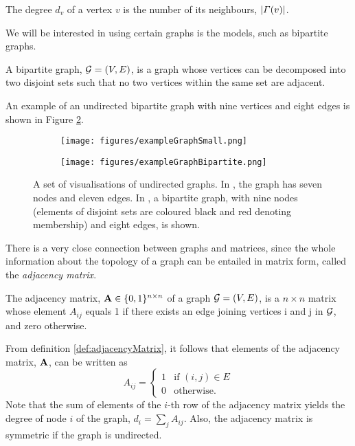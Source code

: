 \begin{definition}
	\label{def:degreeNode}
	The degree $d_{v}$ of a vertex $v$ is the number of its neighbours, $\left\vert\Gamma(v)\right\vert$.
\end{definition}
We will be interested in using certain graphs is the models, such as bipartite graphs.
\begin{definition}
	\label{def:bipartiteGraph}
	A bipartite graph, $\mathcal G = (V,E)$, is a graph whose vertices can be decomposed into two disjoint sets such that no two vertices within the same set are adjacent.
\end{definition}
An example of an undirected bipartite graph with nine vertices and eight edges is shown in Figure \ref{fig:exampleGraphBipartite}.


\begin{figure}
\centering
	\begin{subfigure}{.5\textwidth}
		\centering
		\texttt{[image: figures/exampleGraphSmall.png]}
		\caption{}
		\label{fig:exampleGraphSmall}
	\end{subfigure}%
	\begin{subfigure}{.5\textwidth}
		\centering
		\texttt{[image: figures/exampleGraphBipartite.png]}
		\caption{}
		\label{fig:exampleGraphBipartite}
	\end{subfigure}
	\caption[Visualisations of example undirected graphs]{\label{fig:exampleGraphs} A set of visualisations of undirected graphs. In , the graph has seven nodes and eleven edges. In , a bipartite graph, with nine nodes (elements of disjoint sets are coloured black and red denoting membership) and eight edges, is shown.}
\end{figure}

There is a very close connection between graphs and matrices, since the whole information about the topology of a graph can be entailed in matrix form, called the \textit{adjacency matrix}.
\begin{definition}
	\label{def:adjacencyMatrix}
	The adjacency matrix, $\mathbf A \in \{0,1\}^{n \times n}$ of a graph $\mathcal G = (V,E)$, is a $n\times n$ matrix whose element $A_{ij}$ equals 1 if there exists an edge joining vertices i and j in $\mathcal G$, and zero otherwise.
\end{definition}
From definition \ref{def:adjacencyMatrix}, it follows that elements of the adjacency matrix, $\mathbf A$, can be written as
\begin{equation*}
	A_{ij} =
	\begin{cases}
		1 & \text{if } (i,j) \in E\\
		0 & \text{otherwise}.
	\end{cases}
\end{equation*}
Note that the sum of elements of the $i$-th row of the adjacency matrix yields the degree of node $i$ of the graph, $d_{i} = \sum_{j} A_{ij}$. Also, the adjacency matrix is symmetric if the graph is undirected.

